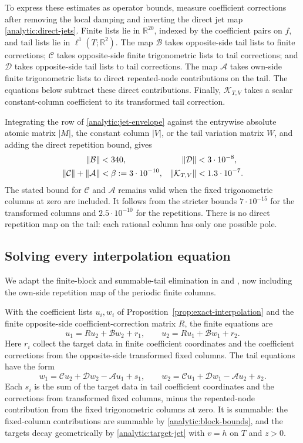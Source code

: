 \documentclass[11pt]{article}
\theoremstyle{remark}\newtheorem{remark}[theorem]{Remark}
\begin{document}
To express these estimates as operator bounds, measure coefficient
corrections after removing the local damping and inverting the direct
jet map \eqref{analytic:direct-jets}. Finite lists lie in
$\mathbb R^{20}$, indexed by the coefficient pairs on $f$, and tail
lists lie in $\ell^1(T;\mathbb R^2)$.
The map $\mathcal B$ takes opposite-side tail lists to finite
corrections; $\mathcal C$ takes opposite-side finite trigonometric
lists to tail corrections; and $\mathcal D$ takes opposite-side tail
lists to tail corrections. The map $\mathcal A$ takes own-side finite
trigonometric lists to direct repeated-node contributions on the tail.
The equations below subtract these direct contributions.
Finally, $\mathcal K_{T,V}$ takes a scalar constant-column coefficient
to its transformed tail correction.

Integrating the row of \eqref{analytic:jet-envelope} against the
entrywise absolute atomic matrix $|M|$, the constant column $|V|$, or
the tail variation matrix $W$, and adding the direct repetition bound,
gives
\begin{align}
 \|\mathcal B\|&<340,
 &\|\mathcal D\|&<3\cdot10^{-8},\notag\\
 \|\mathcal C\|+\|\mathcal A\|&<\beta:=3\cdot10^{-10},
 &\|\mathcal K_{T,V}\|&<1.3\cdot10^{-7}.
 \label{analytic:block-bounds}
\end{align}
The stated bound for $\mathcal C$ and $\mathcal A$ remains valid when
the fixed trigonometric columns at zero are included. It follows from
the stricter bounds $7\cdot10^{-15}$ for the transformed columns and
$2.5\cdot10^{-10}$ for the repetitions. There is no direct repetition
map on the tail: each rational column has only one possible pole.

\subsection{Solving every interpolation equation}

We adapt the finite-block and summable-tail elimination in
\cite[Lemma~3.3 and Proposition~3.4]{SharpPlanar2026} and
\cite[Proposition~4.1, proof]{UniversalTriangular2026}, now including
the own-side repetition map of the periodic finite columns.

With the coefficient lists $u_i,w_i$ of
Proposition~\ref{prop:exact-interpolation} and the finite opposite-side
coefficient-correction matrix $R$, the finite equations are
\[
 u_1=Ru_2+\mathcal B w_2+r_1,\qquad
 u_2=Ru_1+\mathcal B w_1+r_2.
\]
Here $r_i$ collect the target data in finite coefficient coordinates and
the coefficient corrections from the opposite-side transformed fixed columns.
The tail equations have the form
\[
 w_1=\mathcal C u_2+\mathcal D w_2-\mathcal A u_1+s_1,
 \qquad
 w_2=\mathcal C u_1+\mathcal D w_1-\mathcal A u_2+s_2.
\]
Each $s_i$ is the sum of the target data in tail coefficient coordinates
and the corrections from transformed fixed columns, minus the repeated-node
contribution from the fixed trigonometric columns at zero. It is summable:
the fixed-column contributions are summable by
\eqref{analytic:block-bounds}, and the targets decay geometrically by
\eqref{analytic:target-jet} with $v=h$ on $T$ and $z>0$.
\end{document}
